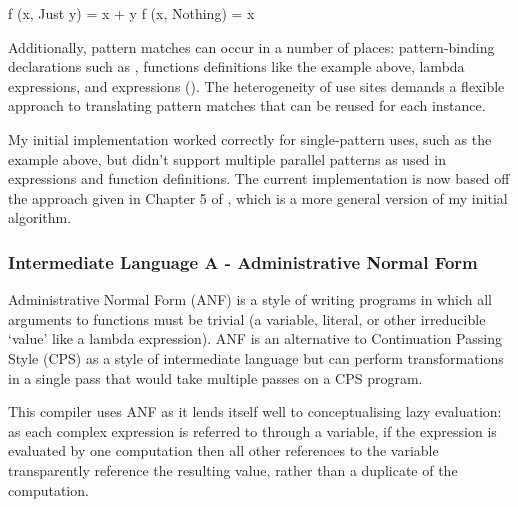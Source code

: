 \documentclass[dissertation.tex]{subfiles}
\begin{document}
{{{            \begin{haskellfigure}
            f (x, Just y) = x + y
            f (x, Nothing) = x
            \end{haskellfigure}

            Additionally, pattern matches can occur in a number of places: pattern-binding declarations such as
            , functions definitions like the example above, lambda expressions, and
             expressions (). The heterogeneity
            of use sites demands a flexible approach to translating pattern matches that can be reused for each
            instance.

            My initial implementation worked correctly for single-pattern uses, such as the  example above,
            but didn't support multiple parallel patterns as used in  expressions and function
            definitions. The current implementation is now based off the approach given in Chapter 5 of
            \cite{ImplFunLang}, which is a more general version of my initial algorithm.



        }
        \subsubsection{Intermediate Language A - Administrative Normal Form}
        {

            Administrative Normal Form (ANF) is a style of writing programs in which all arguments to functions must be
            trivial (a variable, literal, or other irreducible `value' like a lambda expression). ANF is an alternative
            to Continuation Passing Style (CPS) as a style of intermediate language but can perform transformations in a
            single pass that would take multiple passes on a CPS program\cite{ANF}.

            This compiler uses ANF as it lends itself well to conceptualising lazy evaluation: as each complex
            expression is referred to through a variable, if the expression is evaluated by one computation then all
            other references to the variable transparently reference the resulting value, rather than a duplicate of the
            computation.

}}}
\end{document}
